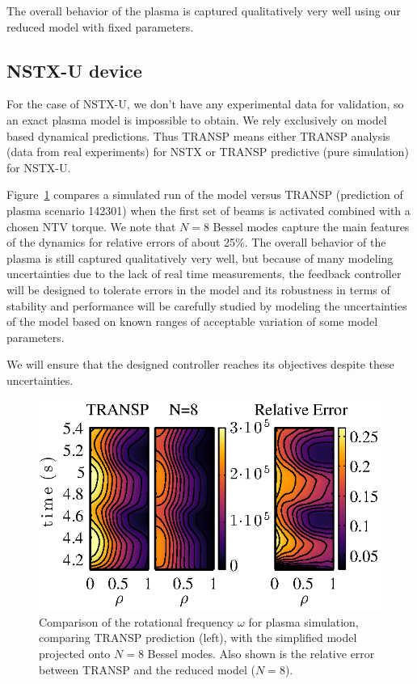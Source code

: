 \documentclass[12pt,lot, lof]{puthesis}
\begin{document}
The overall behavior of the plasma is captured qualitatively very well using our reduced model with fixed parameters.

\subsection{NSTX-U device}


For the case of NSTX-U, we don't have any experimental data for validation, so an exact plasma model is impossible to obtain. We rely exclusively on model based dynamical predictions. Thus TRANSP means either TRANSP analysis (data from real experiments) for NSTX or TRANSP predictive (pure simulation) for NSTX-U.

 Figure~\ref{heho2} compares a simulated run of the model versus TRANSP (prediction of plasma scenario 142301) when the first set of beams is activated combined with a chosen NTV torque.
We note that $N = 8$ Bessel modes capture the main features of the dynamics for relative errors of about 25\%.
The overall behavior of the plasma is still captured qualitatively very well, but because of many modeling uncertainties due to the lack of real time measurements, the feedback controller will be designed to tolerate errors in the model and its robustness in terms of stability and performance will be carefully studied by modeling the uncertainties of the model based on known ranges of acceptable variation of some model parameters.

We will ensure that the designed controller reaches its objectives despite these uncertainties.
\begin{figure}[htbp]
\centering
\includegraphics [width=0.8 \linewidth]{chap10/fig10} 
\caption{Comparison of the rotational frequency $\omega$ for plasma simulation, comparing TRANSP prediction (left), with the simplified model projected onto $N=8$ Bessel modes.  Also shown is the relative error between TRANSP and the reduced model ($N=8$).}
\label{heho2}
\end{figure}
\end{document}
